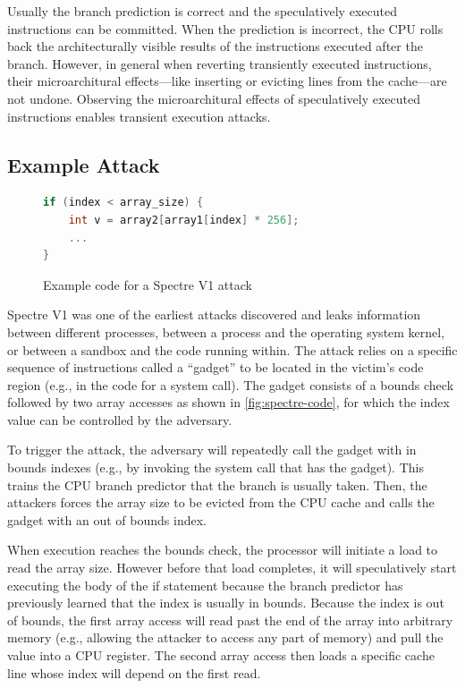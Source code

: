 Usually the branch prediction is correct and the speculatively executed instructions can be committed.
When the prediction is incorrect, the CPU rolls back the architecturally visible results of the instructions executed after the branch.
However, in general when reverting transiently executed instructions, their microarchitural effects---like inserting or evicting lines from the cache---are not undone.
Observing the  microarchitural effects of speculatively executed instructions enables transient execution attacks.

\subsection{Example Attack}
\begin{figure}[h]
\begin{lstlisting}[language=C, style=codeStyle]
if (index < array_size) {
    int v = array2[array1[index] * 256];
    ...
}
\end{lstlisting}
\caption{Example code for a Spectre V1 attack}
\label{fig:spectre-code}
\end{figure}
Spectre V1 was one of the earliest attacks discovered and leaks information between different processes, between a process and the operating system kernel, or between a sandbox and the code running within.
The attack relies on a specific sequence of instructions called a ``gadget'' to be located in the victim's code region (e.g., in the code for a system call).
The gadget consists of a bounds check followed by two array accesses as shown in \autoref{fig:spectre-code}, for which the index value can be controlled by the adversary.

To trigger the attack, the adversary will repeatedly call the gadget with in bounds indexes (e.g., by invoking the system call that has the gadget).
This trains the CPU branch predictor that the branch is usually taken.
Then, the attackers forces the array size to be evicted from the CPU cache and calls the gadget with an out of bounds index.

When execution reaches the bounds check, the processor will initiate a load to read the array size.
However before that load completes, it will speculatively start executing the body of the if statement because the branch predictor has previously learned that the index is usually in bounds.
Because the index is out of bounds, the first array access will read past the end of the array into arbitrary memory (e.g., allowing the attacker to access any part of memory) and pull the value into a CPU register.
The second array access then loads a specific cache line whose index will depend on the first read.

